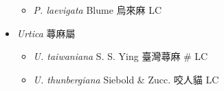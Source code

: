 \begin{itemize}
  \begin{itemize}
        \item[] \textit{P. laevigata} Blume  烏來麻   LC
  \end{itemize}
 \item[] \textit{Urtica} 蕁麻屬
                                
  \begin{itemize}
        \item[] \textit{U. taiwaniana} S. S. Ying  臺灣蕁麻  \# LC
        \item[] \textit{U. thunbergiana} Siebold \& Zucc.  咬人貓   LC
  \end{itemize}
  \end{itemize}
